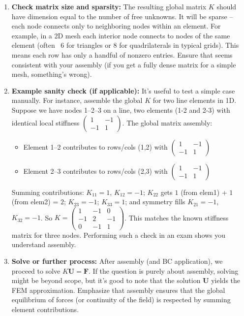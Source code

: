 \documentclass[a4paper,11pt]{report}
\begin{document}
\begin{enumerate}
    \item \textbf{Check matrix size and sparsity:} The resulting global matrix $K$ should have dimension equal to the number of free unknowns. It will be sparse -- each node connects only to neighboring nodes within an element. For example, in a 2D mesh each interior node connects to nodes of the same element (often ~6 for triangles or 8 for quadrilaterals in typical grids). This means each row has only a handful of nonzero entries. Ensure that seems consistent with your assembly (if you get a fully dense matrix for a simple mesh, something's wrong).

    \item \textbf{Example sanity check (if applicable):} It's useful to test a simple case manually. For instance, assemble the global $K$ for two line elements in 1D. Suppose we have nodes 1--2--3 on a line, two elements (1-2 and 2-3) with identical local stiffness $\begin{pmatrix}1&-1\\-1&1\end{pmatrix}$. The global matrix assembly:
          \begin{itemize}
              \item Element 1--2 contributes to rows/cols (1,2) with $\begin{pmatrix}1&-1\\-1&1\end{pmatrix}$
              \item Element 2--3 contributes to rows/cols (2,3) with $\begin{pmatrix}1&-1\\-1&1\end{pmatrix}$
          \end{itemize}
          Summing contributions: $K_{11}=1$, $K_{12}=-1$; $K_{22}$ gets $1$ (from elem1) + $1$ (from elem2) = $2$; $K_{23}=-1$; $K_{33}=1$; and symmetry fills $K_{21}=-1$, $K_{32}=-1$. So $K = \begin{pmatrix}1&-1&0\\-1&2&-1\\0&-1&1\end{pmatrix}$. This matches the known stiffness matrix for three nodes. Performing such a check in an exam shows you understand assembly.

    \item \textbf{Solve or further process:} After assembly (and BC application), we proceed to solve $K \mathbf{U} = \mathbf{F}$. If the question is purely about assembly, solving might be beyond scope, but it's good to note that the solution $\mathbf{U}$ yields the FEM approximation. Emphasize that assembly ensures that the global equilibrium of forces (or continuity of the field) is respected by summing element contributions.
\end{enumerate}
\end{document}
